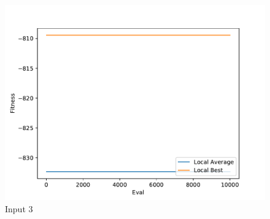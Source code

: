 \documentclass{standalone}
\begin{document}
\begin{figure}[!htb]
	\caption{Input 3}
	\label{fig:graph_3063}
	\includegraphics[width=\textwidth]{../graphs/graphs/3063.pdf}
\end{figure}
\end{document}

